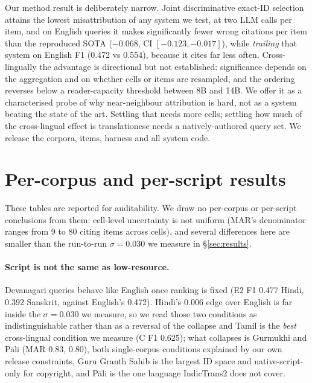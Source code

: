\documentclass[11pt]{article}
\begin{document}
Our method result is deliberately narrow. Joint discriminative exact-ID selection
attains the lowest misattribution of any system we test, at two LLM calls per
item, and on English queries it makes significantly fewer wrong citations per item
than the reproduced SOTA ($-0.068$, CI $[-0.123,-0.017]$), while \emph{trailing}
that system on English F1 (0.472 vs 0.554), because it cites far less often.
Cross-lingually the advantage is directional but not established: significance
depends on the aggregation and on whether cells or items are resampled, and the
ordering reverses below a reader-capacity threshold between 8B and 14B. We offer it as a characterised probe of why near-neighbour
attribution is hard, not as a system beating the state of the art. Settling that
needs more cells; settling how much of the cross-lingual effect is translationese
needs a natively-authored query set. We release the corpora, items, harness and
all system code.





\appendix

\section{Per-corpus and per-script results}
\label{app:percorpus}

These tables are reported for auditability. We draw no per-corpus or per-script
conclusions from them: cell-level uncertainty is not uniform (MAR's denominator
ranges from 9 to 80 citing items across cells), and several differences here are
smaller than the run-to-run $\sigma\!=\!0.030$ we measure in \S\ref{sec:results}.

\paragraph{Script is not the same as low-resource.} Devanagari queries behave
like English once ranking is fixed (E2 F1 0.477 Hindi, 0.392 Sanskrit, against
English's 0.472). Hindi's 0.006 edge over English is far inside the
$\sigma\!=\!0.030$ we measure, so we read those two conditions as
indistinguishable rather than as a reversal of the collapse and Tamil is the \emph{best} cross-lingual condition we measure
(C F1 0.625); what collapses is Gurmukhi and P\={a}li (MAR 0.83, 0.80), both
single-corpus conditions explained by our own release constraints, Guru Granth
Sahib is the largest ID space and native-script-only for copyright, and P\={a}li
is the one language IndicTrans2 does not cover.
\end{document}
